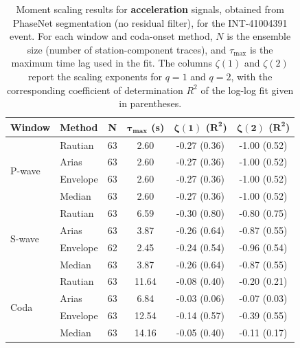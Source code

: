 \begin{table}[H]
\centering
\small
\begin{tabular}{llcccc}
\toprule
\textbf{Window} & \textbf{Method} & \textbf{N} & $\bm{\tau_{\max}}$ \textbf{(s)} & $\bm{\zeta(1)}$ \textbf{(}$\bm{R^2}$\textbf{)} & $\bm{\zeta(2)}$ \textbf{(}$\bm{R^2}$\textbf{)} \\
\midrule
\multirow{4}{*}{P-wave}
& Rautian & 63 & 2.60 & -0.27 (0.36) & -1.00 (0.52) \\
& Arias & 63 & 2.60 & -0.27 (0.36) & -1.00 (0.52) \\
& Envelope & 63 & 2.60 & -0.27 (0.36) & -1.00 (0.52) \\
& Median & 63 & 2.60 & -0.27 (0.36) & -1.00 (0.52) \\
\midrule
\multirow{4}{*}{S-wave}
& Rautian & 63 & 6.59 & -0.30 (0.80) & -0.80 (0.75) \\
& Arias & 63 & 3.87 & -0.26 (0.64) & -0.87 (0.55) \\
& Envelope & 62 & 2.45 & -0.24 (0.54) & -0.96 (0.54) \\
& Median & 63 & 3.87 & -0.26 (0.64) & -0.87 (0.55) \\
\midrule
\multirow{4}{*}{Coda}
& Rautian & 63 & 11.64 & -0.08 (0.40) & -0.20 (0.21) \\
& Arias & 63 & 6.84 & -0.03 (0.06) & -0.07 (0.03) \\
& Envelope & 63 & 12.54 & -0.14 (0.57) & -0.39 (0.55) \\
& Median & 63 & 14.16 & -0.05 (0.40) & -0.11 (0.17) \\
\bottomrule
\end{tabular}
\caption{Moment scaling results for \textbf{acceleration} signals, obtained from PhaseNet segmentation (no residual filter), for the INT-41004391 event. For each window and coda-onset method, $N$ is the ensemble size (number of station-component traces), and $\tau_{\max}$ is the maximum time lag used in the fit. The columns $\zeta(1)$ and $\zeta(2)$ report the scaling exponents for $q=1$ and $q=2$, with the corresponding coefficient of determination $R^2$ of the log-log fit given in parentheses.}
\label{tab:phasenet_scaling_acc_nothresh_queyras}
\end{table}